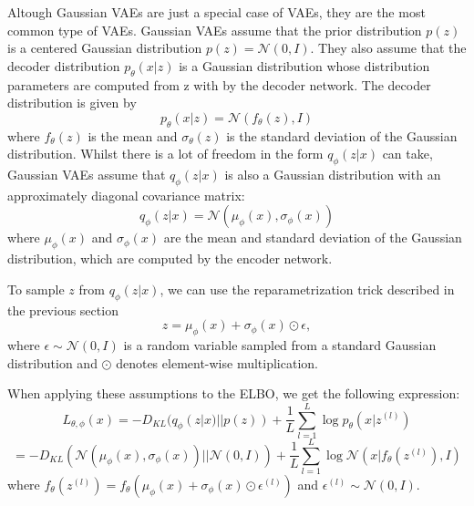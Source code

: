 Altough Gaussian VAEs are just a special case of VAEs, they are the most common type of VAEs. Gaussian VAEs assume that the prior distribution $p(z)$ is a centered Gaussian distribution $ p(z) = \mathcal{N}(0, I)$. They also assume that the decoder distribution $p_{\theta}(x|z)$ is a Gaussian distribution whose distribution parameters are computed from z with by the decoder network. The decoder distribution is given by
\[ p_{\theta}(x|z) = \mathcal{N}(f_{\theta}(z), I) \]
where $f_{\theta}(z)$ is the mean and $\sigma_{\theta}(z)$ is the standard deviation of the Gaussian distribution. Whilst there is a lot of freedom in the form $q_{\phi}(z|x)$ can take, Gaussian VAEs assume that $q_{\phi}(z|x)$ is also a Gaussian distribution with an approximately diagonal covariance matrix: 
\[ q_{\phi}(z|x) = \mathcal{N}(\mu_{\phi}(x), \sigma_{\phi}(x)) \]
where $\mu_{\phi}(x)$ and $\sigma_{\phi}(x)$ are the mean and standard deviation of the Gaussian distribution, which are computed by the encoder network.

To sample $z$ from $q_{\phi}(z|x)$, we can use the reparametrization trick described in the previous section
\[ z = \mu_{\phi}(x) + \sigma_{\phi}(x) \odot \epsilon, \] 
where $\epsilon \sim \mathcal{N}(0, I)$ is a random variable sampled from a standard Gaussian distribution and $\odot$ denotes element-wise multiplication.

When applying these assumptions to the ELBO, we get the following expression: \[ L_{\theta, \phi}(x) = - D_{KL}(q_{\phi}(z|x) || p(z)) + \frac{1}{L} \sum_{l=1}^{L} \log p_{\theta}(x|z^{(l)}) \]
\[ = - D_{KL}(\mathcal{N}(\mu_{\phi}(x), \sigma_{\phi}(x)) || \mathcal{N}(0, I)) + \frac{1}{L} \sum_{l=1}^{L} \log \mathcal{N}(x|f_{\theta}(z^{(l)}), I) \]
where $f_{\theta}(z^{(l)}) = f_{\theta}(\mu_{\phi}(x) + \sigma_{\phi}(x) \odot \epsilon^{(l)})$ and $\epsilon^{(l)} \sim \mathcal{N}(0, I)$.


